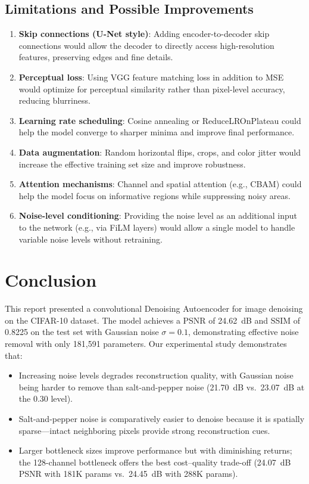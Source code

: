 \documentclass[runningheads]{llncs}
\begin{document}
\subsection{Limitations and Possible Improvements}
\begin{enumerate}[nosep]
    \item \textbf{Skip connections (U-Net style)}: Adding encoder-to-decoder skip connections would allow the decoder to directly access high-resolution features, preserving edges and fine details.
    \item \textbf{Perceptual loss}: Using VGG feature matching loss in addition to MSE would optimize for perceptual similarity rather than pixel-level accuracy, reducing blurriness.
    \item \textbf{Learning rate scheduling}: Cosine annealing or ReduceLROnPlateau could help the model converge to sharper minima and improve final performance.
    \item \textbf{Data augmentation}: Random horizontal flips, crops, and color jitter would increase the effective training set size and improve robustness.
    \item \textbf{Attention mechanisms}: Channel and spatial attention (e.g., CBAM) could help the model focus on informative regions while suppressing noisy areas.
    \item \textbf{Noise-level conditioning}: Providing the noise level as an additional input to the network (e.g., via FiLM layers) would allow a single model to handle variable noise levels without retraining.
\end{enumerate}


\section{Conclusion}
\label{sec:conclusion}

This report presented a convolutional Denoising Autoencoder for image denoising on the CIFAR-10 dataset. The model achieves a PSNR of 24.62~dB and SSIM of 0.8225 on the test set with Gaussian noise $\sigma=0.1$, demonstrating effective noise removal with only 181{,}591 parameters. Our experimental study demonstrates that:
\begin{itemize}[nosep]
    \item Increasing noise levels degrades reconstruction quality, with Gaussian noise being harder to remove than salt-and-pepper noise (21.70~dB vs.~23.07~dB at the 0.30 level).
    \item Salt-and-pepper noise is comparatively easier to denoise because it is spatially sparse---intact neighboring pixels provide strong reconstruction cues.
    \item Larger bottleneck sizes improve performance but with diminishing returns; the 128-channel bottleneck offers the best cost--quality trade-off (24.07~dB PSNR with 181K params vs.~24.45~dB with 288K params).
\end{itemize}
\end{document}
